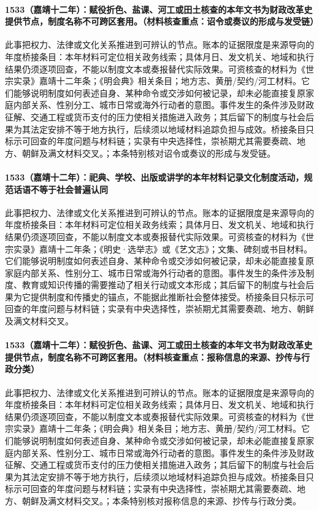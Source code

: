 \paragraph{1533（嘉靖十二年）：赋役折色、盐课、河工或田土核查的本年文书为财政改革史提供节点，制度名称不可跨区套用。（材料核查重点：诏令或奏议的形成与发受链）} 此事把权力、法律或文化关系推进到可辨认的节点。账本的证据限度是来源导向的年度桥接条目：本年材料可定位相关政务线索；具体月日、发文机关、地域和执行结果仍须逐项回查，不能以制度文本或奏报替代实际效果。可资核查的材料为《世宗实录》嘉靖十二年条；《明会典》相关条目；地方志、黄册/契约/河工材料。它们能够说明制度如何表述自身、某种命令或交涉如何被记录，却未必能直接复原家庭内部关系、性别分工、城市日常或海外行动者的意图。事件发生的条件涉及财政征解、交通工程或货币支付的压力使相关措施进入政务；其后留下的制度与社会后果为其法定安排不等于地方执行，后续须以地域材料追踪负担与成效。桥接条目只标示可回查的年度问题与材料链；实录有中央选择性，崇祯期尤其需要奏疏、地方、朝鲜及满文材料交叉。；本条特别核对诏令或奏议的形成与发受链。

\paragraph{1533（嘉靖十二年）：祀典、学校、出版或讲学的本年材料记录文化制度活动，规范话语不等于社会普遍认同} 此事把权力、法律或文化关系推进到可辨认的节点。账本的证据限度是来源导向的年度桥接条目：本年材料可定位相关政务线索；具体月日、发文机关、地域和执行结果仍须逐项回查，不能以制度文本或奏报替代实际效果。可资核查的材料为《世宗实录》嘉靖十二年条；《明史·选举志》或《艺文志》；文集、碑刻或书目材料。它们能够说明制度如何表述自身、某种命令或交涉如何被记录，却未必能直接复原家庭内部关系、性别分工、城市日常或海外行动者的意图。事件发生的条件涉及制度、教育或知识传播的需要推动了相关行动或文本形成；其后留下的制度与社会后果为它提供制度和传播史的锚点，不能据此推断社会整体接受。桥接条目只标示可回查的年度问题与材料链；实录有中央选择性，崇祯期尤其需要奏疏、地方、朝鲜及满文材料交叉。

\paragraph{1533（嘉靖十二年）：赋役折色、盐课、河工或田土核查的本年文书为财政改革史提供节点，制度名称不可跨区套用。（材料核查重点：报称信息的来源、抄传与行政分类）} 此事把权力、法律或文化关系推进到可辨认的节点。账本的证据限度是来源导向的年度桥接条目：本年材料可定位相关政务线索；具体月日、发文机关、地域和执行结果仍须逐项回查，不能以制度文本或奏报替代实际效果。可资核查的材料为《世宗实录》嘉靖十二年条；《明会典》相关条目；地方志、黄册/契约/河工材料。它们能够说明制度如何表述自身、某种命令或交涉如何被记录，却未必能直接复原家庭内部关系、性别分工、城市日常或海外行动者的意图。事件发生的条件涉及财政征解、交通工程或货币支付的压力使相关措施进入政务；其后留下的制度与社会后果为其法定安排不等于地方执行，后续须以地域材料追踪负担与成效。桥接条目只标示可回查的年度问题与材料链；实录有中央选择性，崇祯期尤其需要奏疏、地方、朝鲜及满文材料交叉。；本条特别核对报称信息的来源、抄传与行政分类。

